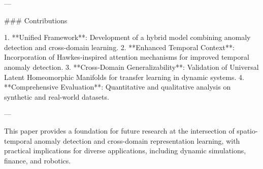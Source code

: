 ---

### Contributions  

1. **Unified Framework**: Development of a hybrid model combining anomaly detection and cross-domain learning.  
2. **Enhanced Temporal Context**: Incorporation of Hawkes-inspired attention mechanisms for improved temporal anomaly detection.  
3. **Cross-Domain Generalizability**: Validation of Universal Latent Homeomorphic Manifolds for transfer learning in dynamic systems.  
4. **Comprehensive Evaluation**: Quantitative and qualitative analysis on synthetic and real-world datasets.  

--- 

This paper provides a foundation for future research at the intersection of spatio-temporal anomaly detection and cross-domain representation learning, with practical implications for diverse applications, including dynamic simulations, finance, and robotics.